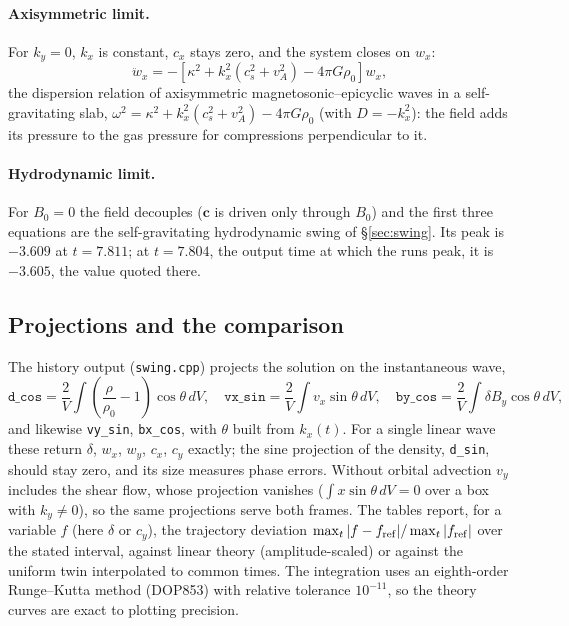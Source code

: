 \documentclass[11pt]{article}
\newcommand{\code}[1]{\texttt{#1}}
\newcommand{\file}[1]{\texttt{\small #1}}
\begin{document}
\paragraph{Axisymmetric limit.} For $k_y = 0$, $k_x$ is constant, $c_x$ stays zero, and the
system closes on $w_x$:
\[
  \ddot w_x = -\left[\kappa^2 + k_x^2\left(c_s^2 + v_A^2\right) - 4\pi G\rho_0\right] w_x ,
\]
the dispersion relation of axisymmetric magnetosonic--epicyclic waves in a
self-gravitating slab, $\omega^2 = \kappa^2 + k_x^2(c_s^2 + v_A^2) - 4\pi G\rho_0$ (with
$D = -k_x^2$): the field adds its pressure to the gas pressure for compressions
perpendicular to it.

\paragraph{Hydrodynamic limit.} For $B_0 = 0$ the field decouples ($\mathbf c$ is driven
only through $B_0$) and the first three equations are the self-gravitating hydrodynamic
swing of \S\ref{sec:swing}. Its peak is $-3.609$ at $t = 7.811$; at $t = 7.804$, the
output time at which the runs peak, it is $-3.605$, the value quoted there.

\subsection{Projections and the comparison}
The history output (\file{swing.cpp}) projects the solution on the instantaneous wave,
\[
  \texttt{d\_cos} = \frac{2}{V}\!\int\!\left(\frac{\rho}{\rho_0} - 1\right)\cos\theta\,dV,
  \quad
  \texttt{vx\_sin} = \frac{2}{V}\!\int\! v_x\sin\theta\,dV,
  \quad
  \texttt{by\_cos} = \frac{2}{V}\!\int\! \delta B_y\cos\theta\,dV,
\]
and likewise \code{vy\_sin}, \code{bx\_cos}, with $\theta$ built from $k_x(t)$. For a single
linear wave these return $\delta$, $w_x$, $w_y$, $c_x$, $c_y$ exactly; the sine
projection of the density, \code{d\_sin}, should stay zero, and its size measures phase
errors. Without orbital advection $v_y$ includes the shear flow, whose projection vanishes
($\int x\sin\theta\,dV = 0$ over a box with $k_y \neq 0$), so the same projections serve
both frames. The tables report, for a variable $f$ (here $\delta$ or $c_y$), the
trajectory deviation $\max_t|f - f_{\rm ref}|/\max_t|f_{\rm ref}|$ over the stated
interval, against linear theory (amplitude-scaled) or against the uniform twin
interpolated to common times. The integration uses an eighth-order Runge--Kutta
method (DOP853) with relative tolerance $10^{-11}$, so the theory curves are exact to
plotting precision.
\end{document}
